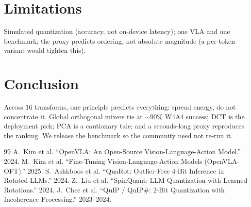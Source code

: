 \documentclass[conference]{IEEEtran}
\begin{document}
\section{Limitations}
Simulated quantization (accuracy, not on-device latency); one VLA and one benchmark; the
proxy predicts ordering, not absolute magnitude (a per-token variant would tighten this).

\section{Conclusion}
Across 16 transforms, one principle predicts everything: spread energy, do not concentrate
it. Global orthogonal mixers tie at $\sim\!90\%$ W4A4 success; DCT is the deployment pick;
PCA is a cautionary tale; and a seconds-long proxy reproduces the ranking. We release the
benchmark so the community need not re-run it.

\begin{thebibliography}{99}
\small
{} A.~Kim et al. ``OpenVLA: An Open-Source Vision-Language-Action Model.'' 2024.
 M.~Kim et al. ``Fine-Tuning Vision-Language-Action Models (OpenVLA-OFT).'' 2025.
 S.~Ashkboos et al. ``QuaRot: Outlier-Free 4-Bit Inference in Rotated LLMs.'' 2024.
 Z.~Liu et al. ``SpinQuant: LLM Quantization with Learned Rotations.'' 2024.
 J.~Chee et al. ``QuIP / QuIP\#: 2-Bit Quantization with Incoherence Processing.'' 2023--2024.
\end{thebibliography}
\end{document}
